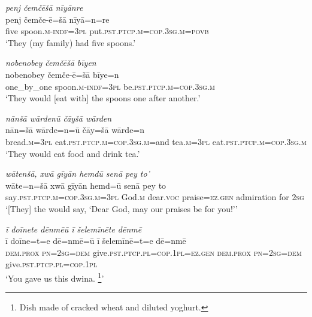 \ea \label{ŽE.46}
\textit{penj čemčēšā nīyānre} \\ 
\gll penj čemče-ē=šā nīyā=n=re \\ 
 five spoon\textsc{.m}\textsc{-indf}\textsc{=3pl} put\textsc{.pst}\textsc{.ptcp}\textsc{.m}\textsc{=cop}\textsc{.3sg}\textsc{.m}\textsc{=\textsc{povb}} \\ 
\glt `They (my family) had five spoons.'
\z 
 
\ea \label{ŽE.47}
\textit{nobenobey čemčēšā bīyen} \\ 
\gll nobenobey čemče-ē=šā bīye=n \\ 
 one\_by\_one spoon\textsc{.m}\textsc{-indf}\textsc{=3pl} be\textsc{.pst}\textsc{.ptcp}\textsc{.m}\textsc{=cop}\textsc{.3sg}\textsc{.m} \\ 
\glt `They would [eat with] the spoons one after another.'
\z 
 
\ea \label{ŽE.48}
\textit{nānšā wārdenū čāyšā wārden} \\ 
\gll nān=šā wārde=n=ū čāy=šā wārde=n \\ 
 bread\textsc{.m}\textsc{=3pl} eat\textsc{.pst}\textsc{.ptcp}\textsc{.m}\textsc{=cop}\textsc{.3sg}\textsc{.m}=and tea\textsc{.m}\textsc{=3pl} eat\textsc{.pst}\textsc{.ptcp}\textsc{.m}\textsc{=cop}\textsc{.3sg}\textsc{.m} \\ 
\glt `They would eat food and drink tea.'
\z 
 
\ea \label{ŽE.49}
\textit{wātenšā, xwā gīyān hemdū senā pey to’} \\ 
\gll wāte=n=šā xwā gīyān hemd=ū senā pey to \\ 
 say\textsc{.pst}\textsc{.ptcp}\textsc{.m}\textsc{=cop}\textsc{.3sg}\textsc{.m}\textsc{=3pl} God\textsc{.m} dear.\textsc{voc} praise\textsc{\textsc{=ez.gen}} admiration for \textsc{2sg} \\ 
\glt `[They] the would say, ‘Dear God, may our praises be for you!’'
\z 
 
\ea \label{ŽE.50}
\textit{ī doīnete dēnmēū ī šelemīnēte dēnmē} \\ 
\gll ī doīne=t=e dē=nmē=ū ī šelemīnē=t=e dē=nmē \\ 
 \textsc{dem.prox} \textsc{pn}\textsc{=\textsc{2sg}}\textsc{=dem} give\textsc{.pst}\textsc{.ptcp}\textsc{.pl}\textsc{=cop}\textsc{.1pl}\textsc{\textsc{=ez.gen}} \textsc{dem.prox} \textsc{pn}\textsc{=\textsc{2sg}}\textsc{=dem} give\textsc{.pst}\textsc{.ptcp}\textsc{.pl}\textsc{=cop}\textsc{.1pl} \\ 
\glt `You gave us this dwina. \footnote{Dish made of cracked wheat and diluted yoghurt.}'
\z 
 
